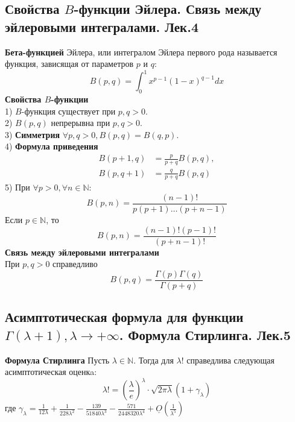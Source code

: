 \documentclass{article}
\begin{document}
\subsection{Свойства $B$-функции Эйлера. Связь между эйлеровыми интегралами. Лек.4}
	\textbf{Бета-функцией} Эйлера, или {интегралом Эйлера первого рода} называется функция, зависящая от параметров $ p $ и $ q$: 
	\begin{equation}
	\label{8.1}
	B(p, q)=\int_{0}^{1} x^{p-1}(1-x)^{q-1} d x
	\end{equation}
	\textbf{Свойства $B$-функции}\\
	1) $B$-функция существует при $p,q>0$.\\
	2) $B(p,q)$ непрерывна при $p,q>0$.\\
	3) \textbf{Симметрия} $\forall p,q>0, B(p,q)=B(q,p)$.\\
	4) \textbf{Формула приведения} 
	\begin{equation}
	\label{8.2}
	\begin{aligned}
	B(p+1,q)&=\frac{p}{p+q} B(p,q),\\
	B(p,q+1)&=\frac{q}{p+q} B(p,q)
	\end{aligned}
	\end{equation}
	5) При $\forall p>0,\forall n\in \mathbb{N}$:
	\begin{equation}
	\label{8.3}
	B(p,n)=\frac{(n-1)!}{p(p+1)\ldots(p+n-1)}
	\end{equation}
	Если $p\in \mathbb{N}$, то 
	\begin{equation}
	\label{8.4}
	B(p,n)=\frac{(n-1)!(p-1)!}{(p+n-1)!}
	\end{equation}
	\textbf{Связь между эйлеровыми интегралами}\\
	При $p,q>0$ справедливо 
	\begin{equation}
	\label{8.5}
	B(p, q)=\frac{\Gamma(p)\Gamma(q)}{\Gamma(p+q)}
	\end{equation}
\subsection{Асимптотическая формула для функции $\Gamma(\lambda+1),\lambda\rightarrow+\infty$. Формула Стирлинга. Лек.5}
	\textbf{Формула Стирлинга} Пусть $ \lambda \in \mathbb{N} $. Тогда для $ \lambda !$ справедлива следующая асимптотическая
	оценкa:
	\begin{equation}
	\label{9.2}
	\lambda !=\left(\frac{\lambda}{e}\right)^{\lambda} \cdot \sqrt{2 \pi \lambda}\left(1+\gamma_{\lambda}\right)
	\end{equation}
	где $\gamma_{\lambda}=\frac{1}{12 \lambda}+\frac{1}{228 \lambda^{2}}-\frac{139}{51840 \lambda^{3}}-\frac{571}{2448320 \lambda^{4}}+\underline{O}\left(\frac{1}{\lambda^{5}}\right)$
	
\end{document}
